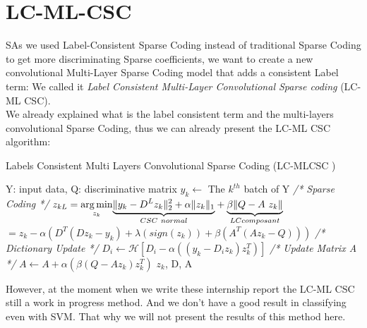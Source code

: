 \section{LC-ML-CSC}
SAs we used Label-Consistent Sparse Coding instead of traditional Sparse Coding to get more discriminating Sparse coefficients, we want to create a new convolutional Multi-Layer Sparse Coding model that adds a consistent Label term: We called it \textit{Label Consistent Multi-Layer Convolutional Sparse coding} (LC-ML CSC).\\
We already explained what is the label consistent term and the multi-layers convolutional Sparse Coding, thus we can already present the LC-ML CSC algorithm:
\begin{algorithm}
\caption{Labels Consistent Multi Layers Convolutional Sparse Coding (LC-MLCSC )}
\begin{algorithmic} 
\REQUIRE Y: input data, Q: discriminative matrix
    \STATE $y_k \leftarrow $ The $k^{th}$ batch of Y
    \STATE \textit{/* Sparse Coding */} 
    \STATE $z_{kL} = \underset{z_k}{\argmin} \underset{CSC\ normal}{\underbrace{\|y_k - D^L z_k\|^2_2 +\alpha \|z_k\|_1}} + \underset{LC composant}{\underbrace{\beta \|Q -A z_k\|}}$ 
    \STATE $ = z_k  - \alpha(D^T (Dz_k -y_k) + \lambda(sign(z_k)) + \beta (A^T(A z_k -Q)))$
    \STATE \textit{/* Dictionary Update */}
        \STATE $D_i \leftarrow \mathcal{H}[D_i - \alpha ((y_k -D_iz_k)z_k^T) ] $
    \ENDFOR
    \STATE \textit{/* Update Matrix A */}
    \STATE $A \leftarrow A + \alpha (\beta (Q-Az_k)z_k^T)$
\ENDFOR
\RETURN $z_k$, D, A
\end{algorithmic}
\end{algorithm}

However, at the moment when we write these internship report the LC-ML CSC still a work in progress method. And we don't have a good result in classifying even with SVM. That why we will not present the results of this method here.
